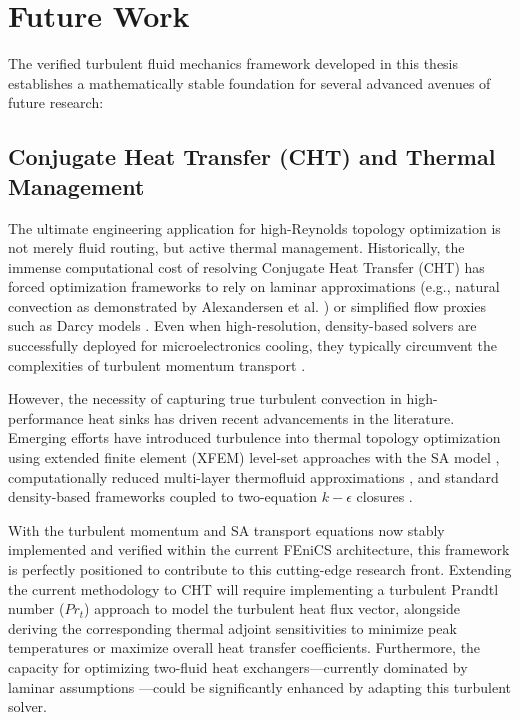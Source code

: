 \section{Future Work}
The verified turbulent fluid mechanics framework developed in this thesis establishes a mathematically stable foundation for several advanced avenues of future research:

\subsection{Conjugate Heat Transfer (CHT) and Thermal Management}
The ultimate engineering application for high-Reynolds topology optimization is not merely fluid routing, but active thermal management. Historically, the immense computational cost of resolving Conjugate Heat Transfer (CHT) has forced optimization frameworks to rely on laminar approximations (e.g., natural convection as demonstrated by Alexandersen et al. \cite{Alexandersen2014}) or simplified flow proxies such as Darcy models \cite{Zhao2018}. Even when high-resolution, density-based solvers are successfully deployed for microelectronics cooling, they typically circumvent the complexities of turbulent momentum transport \cite{Barroca2023}. 

However, the necessity of capturing true turbulent convection in high-performance heat sinks has driven recent advancements in the literature. Emerging efforts have introduced turbulence into thermal topology optimization using extended finite element (XFEM) level-set approaches with the SA model \cite{Maute2023}, computationally reduced multi-layer thermofluid approximations \cite{Zhao2021}, and standard density-based frameworks coupled to two-equation $k-\epsilon$ closures \cite{Sun2023}.

With the turbulent momentum and SA transport equations now stably implemented and verified within the current FEniCS architecture, this framework is perfectly positioned to contribute to this cutting-edge research front. Extending the current methodology to CHT will require implementing a turbulent Prandtl number ($Pr_t$) approach to model the turbulent heat flux vector, alongside deriving the corresponding thermal adjoint sensitivities to minimize peak temperatures or maximize overall heat transfer coefficients. Furthermore, the capacity for optimizing two-fluid heat exchangers—currently dominated by laminar assumptions \cite{Andreasen2020}—could be significantly enhanced by adapting this turbulent solver.

